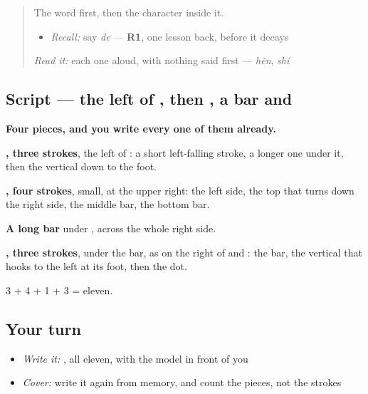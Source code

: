 \label{lesson:ZH-W152-de-complement}



\begin{quote}
The word first, then the character inside it.

\begin{itemize}
\raggedright
  \item \emph{Recall:} say \emph{de} — \textbf{R1}, one lesson back, before it decays
\end{itemize}

\begin{quote}
 
\end{quote}

\emph{Read it:} each one aloud, with nothing said first — \emph{hěn}, \emph{shí}
\end{quote}

\subsection*{Script — the left of , then , a bar and }

\begin{quote}
\end{quote}

\textbf{Four pieces, and you write every one of them already.}

\textbf{, three strokes}, the left of : a short left-falling stroke, a longer one under it, then the vertical down to the foot.

\textbf{, four strokes}, small, at the upper right: the left side, the top that turns down the right side, the middle bar, the bottom bar.

\textbf{A long bar} under , across the whole right side.

\textbf{, three strokes}, under the bar, as on the right of  and : the bar, the vertical that hooks to the left at its foot, then the dot.

3 + 4 + 1 + 3 = eleven.

\subsection*{Your turn}
\begin{itemize}
\raggedright
  \item \emph{Write it:} , all eleven, with the model in front of you
  \item \emph{Cover:} write it again from memory, and count the pieces, not the strokes
\end{itemize}

